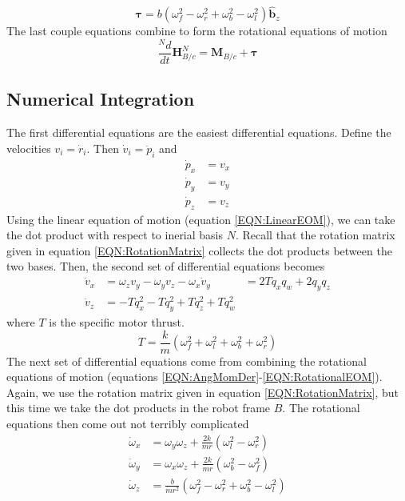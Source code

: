 \documentclass[lettersize,journal]{IEEEtran}
\begin{document}
\begin{equation}
  \boldsymbol\tau = b\left(\omega_f^2-\omega_r^2+\omega_b^2-\omega_l^2\right)\mathbf{\hat{b}}_z
\end{equation}
The last couple equations combine to form the rotational equations of motion
\begin{equation}
  \frac{^Nd}{dt}\mathbf{H}^N_{B/c} = \mathbf{M}_{B/c} + \boldsymbol\tau \label{EQN:RotationalEOM}
\end{equation}
\subsection{Numerical Integration}
The first differential equations are the easiest differential equations. Define the velocities $v_i = \dot{r}_i$. Then $\dot{v}_i=\ddot{p}_i$ and
\begin{align}
  \dot{p}_x &= v_x \label{EQN:VelocityX}\\
  \dot{p}_y &= v_y \\
  \dot{p}_z &= v_z \label{EQN:VelocityZ}
\end{align}
Using the linear equation of motion (equation \ref{EQN:LinearEOM}), we can take the dot product with respect to inerial basis $N$.
Recall that the rotation matrix given in equation \ref{EQN:RotationMatrix} collects the dot products between the two bases.
Then, the second set of differential equations becomes
\begin{align}
  \dot{v}_x &= \omega_zv_y-\omega_yv_z-\omega_x
  \dot{v}_y &= 2Tq_xq_w+2q_yq_z \\
  \dot{v}_z &= -Tq_x^2-Tq_y^2+Tq_z^2+Tq_w^2
\end{align}
where $T$ is the specific motor thrust.
\begin{equation}
  T = \frac{k}{m}\left(\omega_f^2 + \omega_l^2 + \omega_b^2 + \omega_r^2\right)
\end{equation}
The next set of differential equations come from combining the rotational equations of motion (equations \ref{EQN:AngMomDer}-\ref{EQN:RotationalEOM}).
Again, we use the rotation matrix given in equation \ref{EQN:RotationMatrix}, but this time we take the dot products in the robot frame $B$.
The rotational equations then come out not terribly complicated
\begin{align}
  \dot{\omega}_x &= \omega_y\omega_z+\frac{2k}{mr}\left(\omega_l^2-\omega_r^2\right) \\
  \dot{\omega}_y &= \omega_x\omega_z+\frac{2k}{mr}\left(\omega_b^2-\omega_f^2\right) \\
  \dot{\omega}_z &= \frac{b}{mr^2}\left(\omega_f^2-\omega_r^2+\omega_b^2-\omega_l^2\right)
\end{align}
\end{document}
